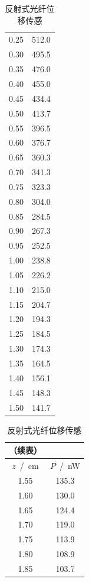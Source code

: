 \documentclass[a4paper]{article}%
\begin{document}
\begin{table}[H]
\begin{minipage}{0.29\linewidth}
\begin{tabular}{cc}
        0.25 	&	512.0 	\\
        0.30 	&	495.5 	\\
        0.35 	&	476.0 	\\
        0.40 	&	455.0 	\\
        0.45 	&	434.4 	\\
        0.50 	&	413.7 	\\
        0.55 	&	396.5 	\\
        0.60 	&	376.7 	\\
        0.65 	&	360.3 	\\
        0.70 	&	341.3 	\\
        0.75 	&	323.3 	\\
        0.80 	&	304.0 	\\
        0.85 	&	284.5 	\\
        0.90 	&	267.3 	\\
        0.95 	&	252.5 	\\
        1.00 	&	238.8 	\\
        1.05 	&	226.2 	\\
        1.10 	&	215.0 	\\
        1.15 	&	204.7 	\\
        1.20 	&	194.3 	\\
        1.25 	&	184.5 	\\
        1.30 	&	174.3 	\\
        1.35 	&	164.5 	\\
        1.40 	&	156.1 	\\
        1.45 	&	148.3 	\\
        1.50 	&	141.7 	\\
        \bottomrule
    \end{tabular}
    \caption{反射式光纤位移传感}\label{003}
\end{minipage}
\begin{minipage}{0.2\linewidth}
  \centering
  \begin{tabular}{cc}
    （续表）\\
      \toprule
      $z$~/~cm & $P$~/~nW\\
      \midrule
      1.55 	&	135.3 	\\
      1.60 	&	130.0 	\\
      1.65 	&	124.4 	\\
      1.70 	&	119.0 	\\
      1.75 	&	113.9 	\\
      1.80 	&	108.9 	\\
      1.85 	&	103.7 	\\

\end{tabular}
\end{minipage}
\end{table}
\end{document}
